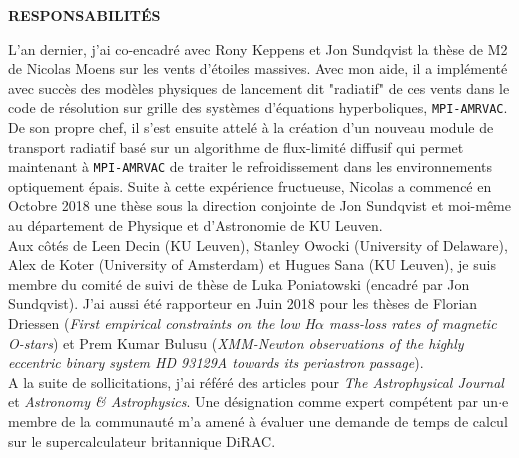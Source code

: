 \documentclass[11pt,onecolumn]{article}
\title{	
\vspace*{-2.5cm}
}
\author{\tiny} %
\date{\tiny }%
\begin{document}


\renewcommand{\headrulewidth}{1pt}
\pagestyle{fancy}
\fancyhf{}
\rhead{}
\rfoot{\thepage / \pageref{LastPage}}

\begin{center}
\Large \textbf{RESPONSABILIT\'{E}S}
\end{center}
\normalfont

L'an dernier, j'ai co-encadré avec Rony Keppens et Jon Sundqvist la th\`ese de M2 de Nicolas Moens sur les vents d'\'etoiles massives. Avec mon aide, il a implémenté avec succès des mod\`eles physiques de lancement dit "radiatif" de ces vents dans le code de r\'esolution sur grille des syst\`emes d'\'equations hyperboliques, \texttt{MPI-AMRVAC}. De son propre chef, il s'est ensuite attelé à la création d'un nouveau module de transport radiatif basé sur un algorithme de flux-limité diffusif qui permet maintenant \`a \texttt{MPI-AMRVAC} de traiter le refroidissement dans les environnements optiquement \'epais. Suite à cette expérience fructueuse, Nicolas a commencé en Octobre 2018 une thèse sous la direction conjointe de Jon Sundqvist et moi-même au département de Physique et d'Astronomie de KU Leuven.\\

Aux côtés de Leen Decin (KU Leuven), Stanley Owocki (University of Delaware), Alex de Koter (University of Amsterdam) et Hugues Sana (KU Leuven), je suis membre du comité de suivi de thèse de Luka Poniatowski (encadré par Jon Sundqvist). J'ai aussi été rapporteur en Juin 2018 pour les thèses de Florian Driessen (\textit{First empirical constraints on the low H$\alpha$ mass-loss rates of magnetic O-stars}) et Prem Kumar Bulusu (\textit{XMM-Newton observations of the highly eccentric binary system HD 93129A towards its periastron passage}).\\

A la suite de sollicitations, j'ai référé des articles pour \textit{The Astrophysical Journal} et \textit{Astronomy \& Astrophysics}. Une désignation comme expert compétent par un$\cdot$e membre de la communauté m'a amené à évaluer une demande de temps de calcul sur le supercalculateur britannique DiRAC.\\
\end{document}
